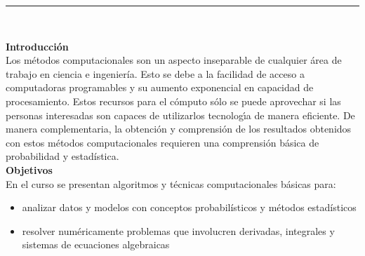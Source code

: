 \documentclass[letterpaper,10pt,onecolumn]{article}
\begin{document}





\noindent\rule{\textwidth}{1pt}\\[-0.1cm]

\addtocounter{mysection}{1}

\noindent\textbf{\large {} \quad Introducci\'on}\\[-0.2cm]


\noindent\normalsize Los m\'etodos computacionales son un aspecto
inseparable de cualquier \'area de trabajo en ciencia e ingenier\'ia.
Esto se debe a la facilidad de acceso a computadoras programables  y
su aumento exponencial en capacidad de procesamiento.  
Estos recursos para el c\'omputo s\'olo se puede aprovechar si las
personas interesadas son capaces de utilizarlos tecnolog\'{\i}a
de manera eficiente.
De manera complementaria, la obtenci\'on y comprensi\'on de los
resultados obtenidos  con estos m\'etodos computacionales requieren
una comprensi\'on b\'asica de probabilidad y estad\'istica. \\[0.1cm]  

\noindent\textbf{\large {} \quad Objetivos}\\[-0.2cm]

\noindent\normalsize En el curso se presentan
algoritmos y t\'ecnicas computacionales b\'asicas para:

\begin{itemize}
\item analizar datos y modelos con conceptos probabil\'isticos y
  m\'etodos estad\'isticos \\[-0.6cm] 
\item resolver num\'ericamente problemas que involucren derivadas,
  integrales y sistemas de ecuaciones algebraicas \\[-0.6cm]
\end{itemize} 
\vspace*{0.5cm} 
\end{document}
